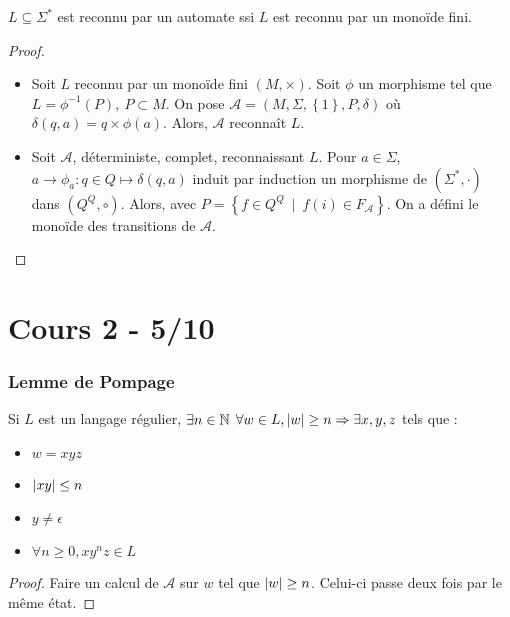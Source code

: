 \documentclass{cours}
\begin{document}
\begin{proposition}
    $L\subseteq \Sigma^{*}$ est reconnu par un automate ssi $L$ est reconnu par un monoïde fini.
\end{proposition}
\begin{proof}
    \begin{itemize}
        \item Soit $L$ reconnu par un monoïde fini $(M, \times)$. Soit $\phi$ un morphisme tel que $L = \phi^{-1}(P), \ P\subset M$. On pose $\mathcal{A} = (M, \Sigma, \left\{1\right\}, P, \delta)$ où $\delta(q, a) = q \times \phi(a)$. Alors, $\mathcal{A}$ reconnaît $L$.
        \item Soit $\mathcal{A}$, déterministe, complet, reconnaissant $L$. Pour $a \in \Sigma$, $a \rightarrow \phi_{a} : q\in Q \mapsto \delta(q, a)$ induit par induction un morphisme de $(\Sigma^{*}, \cdot)$ dans $(Q^{Q}, \circ)$. Alors, avec $P = \left\{f \in Q^{Q}\ \mid \ f(i) \in F_{\mathcal{A}}\right\}$. On a défini le monoïde des transitions de $\mathcal{A}$.
    \end{itemize}
\end{proof}

\part[Quotients et Automates Minimaux]{Cours 2 - 5/10}

\section{Lemme de Pompage}
\begin{theorem}
    Si $L$ est un langage régulier, $\exists n \in \mathbb{N}$ 
    $\forall w \in L, \left|w\right| \geq n \Rightarrow \exists x, y, z$ tels que : 
        \begin{itemize}
            \item $w = xyz$
            \item $\left|xy\right| \leq n$
            \item $y \neq \epsilon$
            \item $\forall n \geq 0, xy^{n}z \in L$
        \end{itemize}
\end{theorem}
\begin{proof}
    Faire un calcul de $\mathcal{A}$ sur $w$ tel que $\left|w\right| \geq n$. Celui-ci passe deux fois par le même état.
\end{proof}
\end{document}
